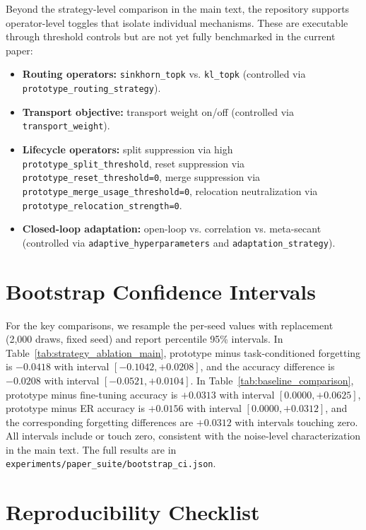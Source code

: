 \documentclass[11pt,a4paper]{article}
\theoremstyle{definition}
\begin{document}
Beyond the strategy-level comparison in the main text, the repository supports operator-level toggles that isolate individual mechanisms. These are executable through threshold controls but are not yet fully benchmarked in the current paper:

\begin{itemize}
    \item \textbf{Routing operators:} \texttt{sinkhorn\_topk} vs. \texttt{kl\_topk} (controlled via \texttt{prototype\_routing\_strategy}).
    \item \textbf{Transport objective:} transport weight on/off (controlled via \texttt{transport\_weight}).
    \item \textbf{Lifecycle operators:} split suppression via high \texttt{prototype\_split\_threshold}, reset suppression via \texttt{prototype\_reset\_threshold=0}, merge suppression via \texttt{prototype\_merge\_usage\_threshold=0}, relocation neutralization via \texttt{prototype\_relocation\_strength=0}.
    \item \textbf{Closed-loop adaptation:} open-loop vs. correlation vs. meta-secant (controlled via \texttt{adaptive\_hyperparameters} and \texttt{adaptation\_strategy}).
\end{itemize}

\section{Bootstrap Confidence Intervals}
\label{sec:bootstrap}

For the key comparisons, we resample the per-seed values with replacement (2{,}000 draws, fixed seed) and report percentile 95\% intervals. In Table~\ref{tab:strategy_ablation_main}, prototype minus task-conditioned forgetting is $-0.0418$ with interval $[-0.1042, +0.0208]$, and the accuracy difference is $-0.0208$ with interval $[-0.0521, +0.0104]$. In Table~\ref{tab:baseline_comparison}, prototype minus fine-tuning accuracy is $+0.0313$ with interval $[0.0000, +0.0625]$, prototype minus ER accuracy is $+0.0156$ with interval $[0.0000, +0.0312]$, and the corresponding forgetting differences are $+0.0312$ with intervals touching zero. All intervals include or touch zero, consistent with the noise-level characterization in the main text. The full results are in \texttt{experiments/paper\_suite/bootstrap\_ci.json}.

\section{Reproducibility Checklist}
\label{sec:reproducibility}
\end{document}

